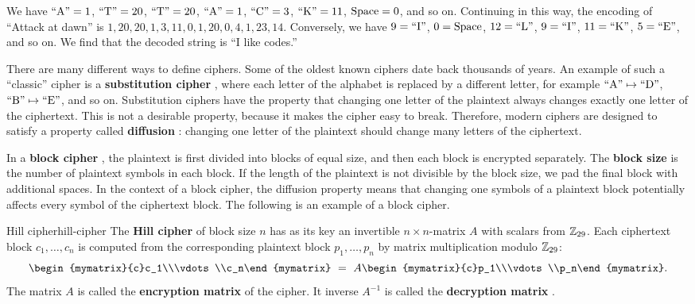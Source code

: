 \begin{solution}
  We have $\mbox{``A''}=1$, $\mbox{``T''}=20$, $\mbox{``T''}=20$, $\mbox{``A''}=1$, $\mbox{``C''}=3$,
  $\mbox{``K''}=11$, $\mbox{Space}=0$, and so on. Continuing in this way, the
  encoding of ``Attack at dawn'' is
  $1,20,20,1,3,11,0,1,20,0,4,1,23,14$.  Conversely, we have $9=\mbox{``I''}$,
  $0=\mbox{Space}$, $12=\mbox{``L''}$, $9=\mbox{``I''}$, $11=\mbox{``K''}$, $5=\mbox{``E''}$, and so
  on. We find that the decoded string is ``I like codes.''
\end{solution}

There are many different ways to define ciphers. Some of the oldest
known ciphers date back thousands of years.  An example of such a
``classic'' cipher is a \textbf{substitution cipher}%
, where
each letter of the alphabet is replaced by a different letter, for
example $\mbox{``A''}\mapsto\mbox{``D''}$, $\mbox{``B''}\mapsto\mbox{``E''}$, and so
on. Substitution ciphers have the property that changing one letter of
the plaintext always changes exactly one letter of the
ciphertext. This is not a desirable property, because it makes the
cipher easy to break. Therefore, modern ciphers are designed to
satisfy a property called \textbf{diffusion}%
: changing one letter of the plaintext should
change many letters of the ciphertext.

In a \textbf{block cipher}%
, the plaintext is
first divided into blocks of equal size, and then each block is
encrypted separately. The \textbf{block size} is the
number of plaintext symbols in each block. If the length of the
plaintext is not divisible by the block size, we pad the final block
with additional spaces. In the context of a block cipher, the
diffusion property means that changing one symbols of a plaintext
block potentially affects every symbol of the ciphertext block. The
following is an example of a block cipher.

\begin{definition}{Hill cipher}{hill-cipher}
  The \textbf{Hill cipher}%
   of block size $n$ has
  as its key an invertible $n\times n$-matrix $A$ with scalars from
  $\mathbb{Z}_{29}$. Each ciphertext block $c_1,\ldots,c_n$  is computed from
  the corresponding plaintext block $p_1,\ldots,p_n$ by matrix
  multiplication modulo $\mathbb{Z}_{29}$:
  \begin{equation*}
    \begin{mymatrix}{c}c_1\\\vdots\\c_n\end{mymatrix}
    ~=~ A\begin{mymatrix}{c}p_1\\\vdots\\p_n\end{mymatrix}.
  \end{equation*}
  The matrix $A$ is called the \textbf{encryption matrix}%
   of the cipher. It
  inverse $A^{-1}$ is called the \textbf{decryption matrix}%
  .
\end{definition}


